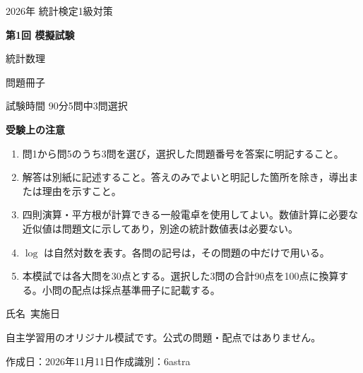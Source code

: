 \documentclass[a4paper,11pt]{ltjsarticle}
\begin{document}
\thispagestyle{empty}
\begin{center}
\vspace*{16mm}
{\large 2026年 統計検定1級対策}\par\vspace{10mm}
{\Huge\bfseries 第1回 模擬試験}\par\vspace{8mm}
{\LARGE 統計数理}\par\vspace{6mm}
{\Large 問題冊子}\par\vspace{14mm}
{\large 試験時間 90分\qquad 5問中3問選択}
\end{center}
\vspace{12mm}
\noindent\textbf{受験上の注意}
\begin{enumerate}[label=\arabic*.,leftmargin=2em,itemsep=1em]
\item 問1から問5のうち3問を選び，選択した問題番号を答案に明記すること。
\item 解答は別紙に記述すること。答えのみでよいと明記した箇所を除き，導出または理由を示すこと。
\item 四則演算・平方根が計算できる一般電卓を使用してよい。数値計算に必要な近似値は問題文に示してあり，別途の統計数値表は必要ない。
\item $\log$ は自然対数を表す。各問の記号は，その問題の中だけで用いる。
\item 本模試では各大問を30点とする。選択した3問の合計90点を100点に換算する。小問の配点は採点基準冊子に記載する。
\end{enumerate}
\vfill
\begin{center}
氏名\ \underline{\hspace{55mm}}\qquad 実施日\ \underline{\hspace{35mm}}\par\vspace{8mm}
\small 自主学習用のオリジナル模試です。公式の問題・配点ではありません。\par
作成日：2026年11月11日\qquad 作成識別：6astra
\end{center}
\newpage
\end{document}
